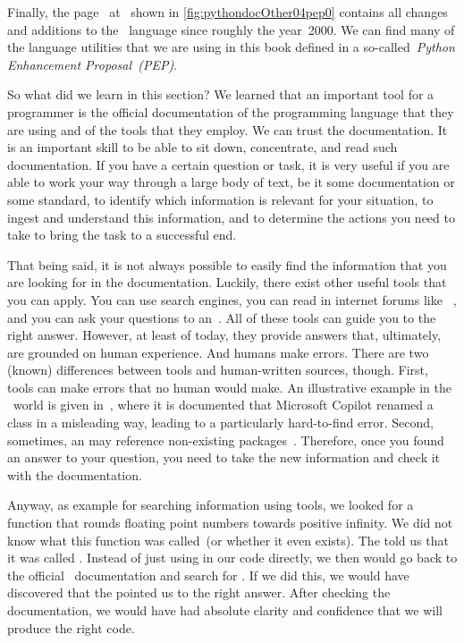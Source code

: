 \begin{noglslink}
Finally, the  page~\cite{PEP0} at~ shown in \cref{fig:pythondocOther04pep0} contains all changes and additions to the \python\ language since roughly the year~2000.
We can find many of the language utilities that we are using in this book defined in a so-called~\emph{Python Enhancement Proposal~(PEP)}.

So what did we learn in this section?
We learned that an important tool for a programmer is the official documentation of the programming language that they are using and of the tools that they employ.
We can trust the documentation.
It is an important skill to be able to sit down, concentrate, and read such documentation.
If you have a certain question or task, it is very useful if you are able to work your way through a large body of text, be it some documentation or some standard, to identify which information is relevant for your situation, to ingest and understand this information, and to determine the actions you need to take to bring the task to a successful end.

That being said, it is not always possible to easily find the information that you are looking for in the documentation.
Luckily, there exist other useful tools that you can apply.
You can use search engines, you can read in internet forums like ~\cite{SE:SO}, and you can ask your questions to an~.
All of these tools can guide you to the right answer.
However, at least of today, they provide answers that, ultimately, are grounded on human experience.
And humans make errors.
There are two (known) differences between  tools and human-written sources, though.
First,  tools can make errors that no human would make.
An illustrative example in the \python\ world is given in~\cite{BSHETB:VSK2025CIC}, where it is documented that Microsoft Copilot renamed a class in a misleading way, leading to a particularly hard-to-find error.
Second, sometimes, an  may reference non-existing packages~\cite{AT:G2025AGCCBADFTSSCHW}.
Therefore, once you found an answer to your question, you need to take the new information and check it with the documentation.

Anyway, as example for searching information using  tools, we looked for a function that rounds floating point numbers towards positive infinity.
We did not know what this function was called~(or whether it even exists).
The  told us that it was called .
Instead of just using  in our code directly, we then would go back to the official \python\ documentation and search for .
If we did this, we would have discovered that the  pointed us to the right answer.
After checking the documentation, we would have had absolute clarity and confidence that we will produce the right code.%
\FloatBarrier%
\end{noglslink}%
\endhsection%
%
